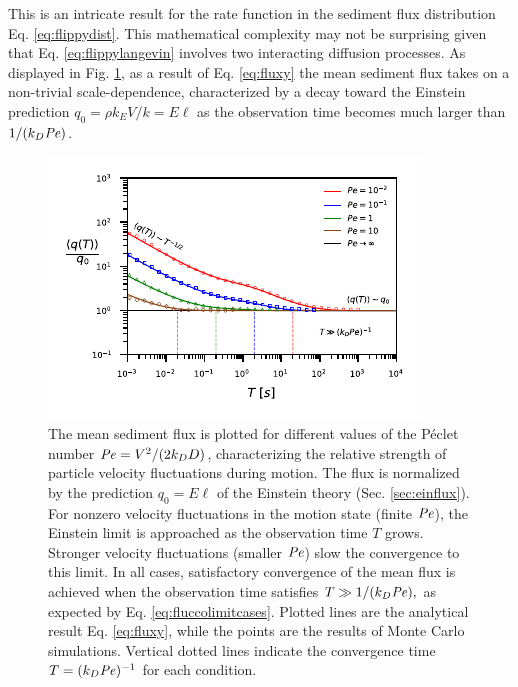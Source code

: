This is an intricate result for the rate function in the sediment flux distribution Eq. \ref{eq:flippydist}. This mathematical complexity may not be surprising given that Eq. \ref{eq:flippylangevin} involves two interacting diffusion processes. As displayed in Fig. \ref{fig:fluxconvergence}, as a result of Eq. \ref{eq:fluxy} the mean sediment flux takes on a non-trivial scale-dependence, characterized by a decay toward the Einstein prediction $q_0 = \rho k_E V/k = E \ell$ as the observation time becomes much larger than $1/(k_D \mbox{\textit{Pe}})$. 
\begin{figure}[!htbp]
	\includegraphics[width=\linewidth,keepaspectratio]{figures/ch2/figure3_slopeKey.pdf}
	\caption{The mean sediment flux is plotted for different values of the P\'{e}clet number $\mbox{\textit{Pe}} = V^2/(2k_D D)$, characterizing the relative strength of particle velocity fluctuations during motion. The flux is normalized by the prediction $q_0 = E \ell$ of the Einstein theory (Sec. \ref{sec:einflux}). For nonzero velocity fluctuations in the motion state (finite $\mbox{\textit{Pe}}$), the Einstein limit is approached as the observation time $T$ grows. Stronger velocity fluctuations (smaller $\mbox{\textit{Pe}}$) slow the convergence to this limit.
	In all cases, satisfactory convergence of the mean flux is achieved when the observation time satisfies $T\gg 1/(k_D \mbox{\textit{Pe}}),$ as expected by Eq. \ref{eq:fluccolimitcases}. Plotted lines are the analytical result Eq. \ref{eq:fluxy}, while the points are the results of Monte Carlo simulations. Vertical dotted lines indicate the convergence time $T = (k_D \mbox{\textit{Pe}})^{-1}$ for each condition. }
	\label{fig:fluxconvergence}
\end{figure}

